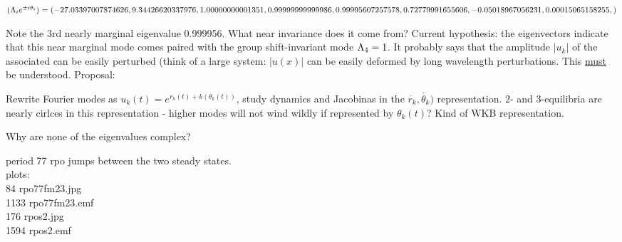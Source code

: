 $(\Lambda_i e^{\pm i\theta_i})=
(
 -27.03397007874626,
   9.34426620337976,
   1.00000000001351,
   0.99999999999986,
   0.99995607257578,
   0.72779991655606,
  -0.05018967056231,
   0.00015065158255,
)$

Note the 3rd nearly marginal eigenvalue 0.999956. What near
invariance does it come from? Current hypothesis: the eigenvectors
indicate that this near marginal mode comes paired with the 
group shift-invariant mode $\Lambda_4 =1$. It probably says that
the amplitude $|u_k|$ of the associated can be easily perturbed (think of
a large system: $|u(x)|$ can be easily deformed by long wavelength
perturbations. This \underline{must} be understood. Proposal:

Rewrite Fourier modes as $u_k(t) = e^{r_k(t) + k(\theta_k(t))}$, study
dynamics and Jacobinas in the $\dot{r_k},\dot{\theta_k})$ representation.
$2$- and $3$-equilibria are nearly cirlces in this representation - higher
modes will not wind wildly if represented by $\theta_k(t)$? Kind of WKB
representation.


Why are none of the eigenvalues complex?

period 77 rpo jumps between the two steady states.
\\
plots:	\\
  84 rpo77fm23.jpg	\\
1133 rpo77fm23.emf	\\
 176 rpos2.jpg	\\
1594 rpos2.emf	\\

